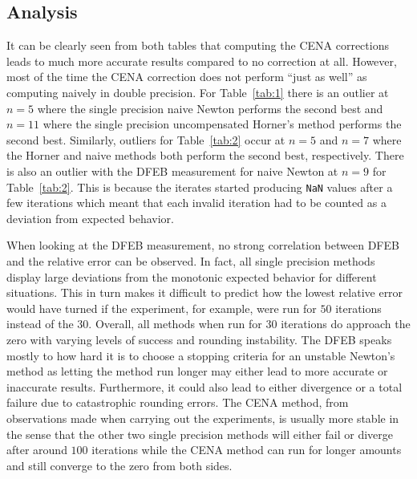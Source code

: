 \documentclass{standalone}
\begin{document}
	\subsection{Analysis}\label{sec:analysis}
	It can be clearly seen from both tables that computing the CENA corrections leads to much more accurate results compared to no correction at all. However, most of the time the CENA correction does not perform ``just as well'' as computing naively in double precision. For Table~\ref{tab:1} there is an outlier at $n=5$ where the single precision naive Newton performs the second best and $n=11$ where the single precision uncompensated Horner's method performs the second best. Similarly, outliers for Table~\ref{tab:2} occur at $n=5$ and $n=7$ where the Horner and naive methods both perform the second best, respectively. There is also an outlier with the DFEB measurement for naive Newton at $n=9$ for Table~\ref{tab:2}. This is because the iterates started producing \texttt{NaN} values after a few iterations which meant that each invalid iteration had to be counted as a deviation from expected behavior.
	\par
	When looking at the DFEB measurement, no strong correlation between DFEB and the relative error can be observed. In fact, all single precision methods display large deviations from the monotonic expected behavior for different situations. This in turn makes it difficult to predict how the lowest relative error would have turned if the experiment, for example, were run for $50$ iterations instead of the $30$. Overall, all methods when run for $30$ iterations do approach the zero with varying levels of success and rounding instability. The DFEB speaks mostly to how hard it is to choose a stopping criteria for an unstable Newton's method as letting the method run longer may either lead to more accurate or inaccurate results. Furthermore, it could also lead to either divergence or a total failure due to catastrophic rounding errors. The CENA method, from observations made when carrying out the experiments, is usually more stable in the sense that the other two single precision methods will either fail or diverge after around $100$ iterations while the CENA method can run for longer amounts and still converge to the zero from both sides.
	\par
\end{document}
